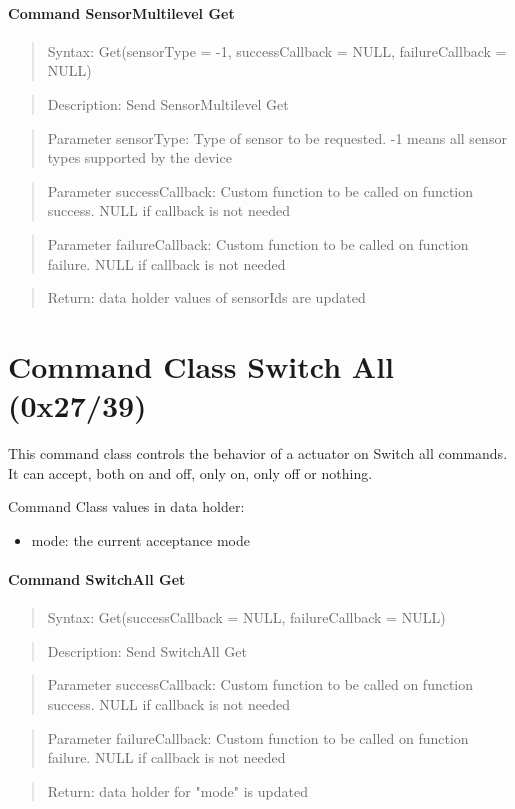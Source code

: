  

\paragraph {Command SensorMultilevel Get}
\begin{quote} Syntax: Get(sensorType = -1, successCallback = NULL, failureCallback = NULL)\end{quote}
\begin{quote} Description: Send SensorMultilevel Get\end{quote}
\begin{quote} Parameter sensorType: Type of sensor to be requested. -1 means all sensor types supported by the device\end{quote}
\begin{quote} Parameter successCallback: Custom function to be called on function success. NULL if callback is not needed\end{quote}
\begin{quote} Parameter failureCallback: Custom function to be called on function failure. NULL if callback is not needed\end{quote}
\begin{quote} Return: data holder values of sensorIds are updated \end{quote}

\section{Command Class Switch All (0x27/39)}

This command class controls the behavior of a actuator on Switch all commands. It can accept, both on and off, only on, only 
off or nothing.

Command Class values in data holder:
\begin{itemize}
\item mode: the current acceptance mode
\end{itemize}

\paragraph {Command SwitchAll Get}
\begin{quote} Syntax: Get(successCallback = NULL, failureCallback = NULL)\end{quote}
\begin{quote} Description: Send SwitchAll Get\end{quote}
\begin{quote} Parameter successCallback: Custom function to be called on function success. NULL if callback is not needed\end{quote}
\begin{quote} Parameter failureCallback: Custom function to be called on function failure. NULL if callback is not needed\end{quote}
\begin{quote} Return: data holder for "mode"  is updated\end{quote}

